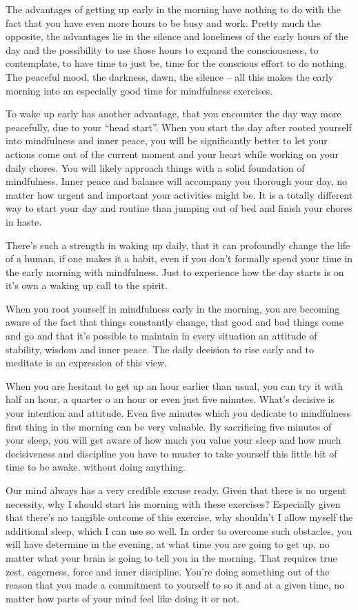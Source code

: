 \documentclass[../main.tex]{subfiles}
\begin{document}
The advantages of getting up early\label{Ex:EarlyMorning} in the morning have nothing to do with the fact that you have even more hours to be busy and work.
Pretty much the opposite, the advantages lie in the silence and loneliness of the early hours of the day
and the possibility to use those hours to expand the consciousness, to contemplate, to have time to just be, time for the conscious effort to do nothing.
The peaceful mood, the darkness, dawn, the silence -- all this makes the early morning into an especially good time for mindfulness exercises.

To wake up early has another advantage, that you encounter the day way more peacefully, due to your ``head start''.
When you start the day after rooted yourself into mindfulness and inner peace, you will be significantly better to let your actions come out of the current moment and your heart while working on your daily chores.
You will likely approach things with a solid foundation of mindfulness.
Inner peace and balance will accompany you thorough your day, no matter how urgent and important your activities might be.
It is a totally different way to start your day and routine than jumping out  of bed and finish your chores in haste.

There's such a strength in waking up daily, that it can profoundly change the life of a human,
if one makes it a habit, even if you don't formally spend your time in the early morning with mindfulness.
Just to experience how the day starts is on it's own a waking up call to the spirit.

When you root yourself in mindfulness early in the morning, you are becoming aware of the fact that things constantly change, that good and bad things come and go
and that it's possible to maintain in every situation an attitude of stability, wisdom and inner peace.
The daily decision to rise early and to meditate is an expression of this view.

When you are hesitant to get up an hour earlier than usual, you can try it with half an hour, a quarter o an hour or even just five minutes.
What's decisive is your intention and attitude.
Even five minutes which you dedicate to mindfulness first thing in the morning can be very valuable.
By sacrificing five minutes of your sleep, you will get aware of how much you value your sleep and how much decisiveness and discipline you have to muster to take yourself this little bit of time to be awake, without doing anything.

Our mind always has a very credible excuse ready. Given that there is no urgent necessity, why I should start his morning with these exercises?
Especially given that there's no tangible outcome of this exercise, why shouldn't I allow myself the additional sleep, which I can use so well.
In order to overcome such obstacles, you will have determine in the evening, at what time you are going to get up, no matter what your brain is going to tell you in the morning.
That requires true zest, eagerness, force and inner discipline. You're doing something out of the reason that you made a commitment to yourself to so it and at a given time, no matter how parts of your mind feel like doing it or not.
\end{document}
